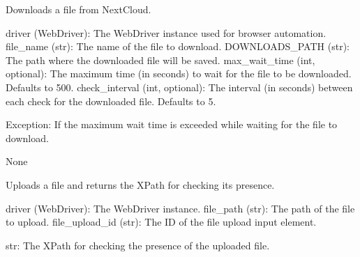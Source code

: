 \documentclass[letterpaper,10pt,english]{sphinxmanual}
\begin{document}
\begin{fulllineitems}
\label{\detokenize{utils:utils.file_management.perform_download_file}}
\pysigstartsignatures
{}
\pysigstopsignatures
\sphinxAtStartPar
Downloads a file from NextCloud.
\begin{description}
\sphinxAtStartPar
driver (WebDriver): The WebDriver instance used for browser automation.
file\_name (str): The name of the file to download.
DOWNLOADS\_PATH (str): The path where the downloaded file will be saved.
max\_wait\_time (int, optional): The maximum time (in seconds) to wait for the file to be downloaded. Defaults to 500.
check\_interval (int, optional): The interval (in seconds) between each check for the downloaded file. Defaults to 5.

\sphinxAtStartPar
Exception: If the maximum wait time is exceeded while waiting for the file to download.

\sphinxAtStartPar
None

\end{description}

\end{fulllineitems}


\begin{fulllineitems}
\label{\detokenize{utils:utils.file_management.perform_file_upload}}
\pysigstartsignatures
{}
\pysigstopsignatures
\sphinxAtStartPar
Uploads a file and returns the XPath for checking its presence.
\begin{description}
\sphinxAtStartPar
driver (WebDriver): The WebDriver instance.
file\_path (str): The path of the file to upload.
file\_upload\_id (str): The ID of the file upload input element.

\sphinxAtStartPar
str: The XPath for checking the presence of the uploaded file.

\end{description}

\end{fulllineitems}
\end{document}
